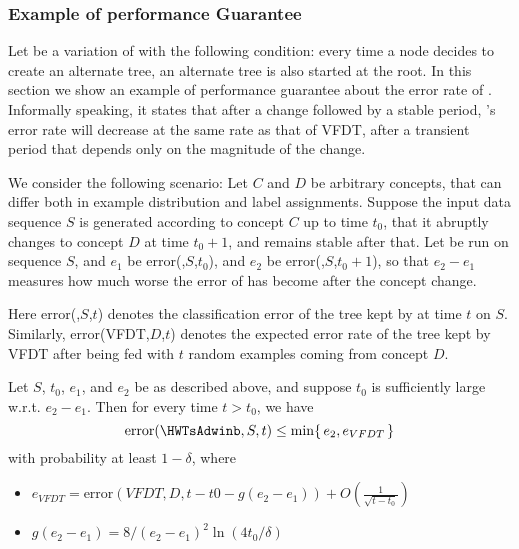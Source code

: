 \subsubsection{Example of performance Guarantee}

Let \HWTsAdwin be a variation of \HWTAdwin with the following condition:
every time a node decides to create an alternate tree, 
an alternate tree is also started at the root. 
In this section we show an example of performance guarantee about
the error rate of \HWTsAdwinb. Informally speaking, it states
that after a change followed by a stable period, 
\HWTsAdwinb's error rate will decrease at the same rate
as that of VFDT, after a transient period that depends only
on the magnitude of the change. 

We consider the following scenario: 
Let $C$ and $D$ be arbitrary concepts, that can differ both in example
distribution and label assignments.
Suppose the input data sequence $S$ is generated according to concept $C$ 
up to time $t_0$, that it abruptly changes to concept $D$ at time $t_0 + 1$, 
and remains stable after that. Let \HWTsAdwin be run on sequence $S$, and 
$e_1$ be error(\HWTsAdwinb,$S$,$t_0$), and $e_2$ be error(\HWTsAdwinb,$S$,$t_0+1$), 
so that $e_2-e_1$ measures how much worse the error of \HWTsAdwin has become after the
concept change. 

Here error(\HWTsAdwinb,$S$,$t$) denotes the classification error
of the tree kept by \HWTsAdwin at time $t$ on $S$. 
Similarly, error(VFDT,$D$,$t$) denotes the expected error rate of the tree
kept by VFDT after being fed with $t$ random examples coming from concept $D$. 

\begin{theorem}
Let $S$, $t_0$, $e_1$, and $e_2$ be as described above, 
and suppose $t_0$ is sufficiently large w.r.t. $e_2-e_1$.
Then for every time $t>t_0$, we have
$$
\mbox{error(\HWTsAdwinb},S,t) \le \min\{\, e_2, e_{{VFDT}}\,\}
$$
with probability at least $1-\delta$, 
where
\begin{itemize}
 \item $e_{{VFDT}}= \mbox{error}(VFDT, D,t-t0-g(e_2-e_1)) +O(\frac{1}{\sqrt{t-t_0}})$
 \item $g(e_2-e_1) = 8 /(e_2-e_1)^2 \ln(4t_0/\delta)$
\end{itemize}

\end{theorem}

